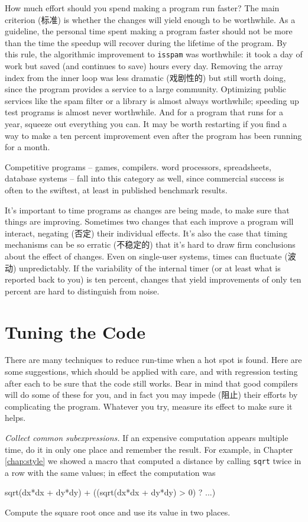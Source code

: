 How much effort should you spend making a program run faster? The main
criterion (标准) is whether the changes will yield enough to be worthwhile.
As a guideline, the personal time spent making a program faster should not
be more than the time the speedup will recover during the lifetime of the
program. By this rule, the algorithmic improvement to \verb'isspam' was
worthwhile: it took a day of work but saved (and continues to save) hours
every day. Removing the array index from the inner loop was less dramatic
(戏剧性的) but still worth doing, since the program provides a service to a
large community. Optimizing public services like the spam filter or a
library is almost always worthwhile; speeding up test programs is almost
never worthwhile. And for a program that runs for a year, squeeze out
everything you can. It may be worth restarting if you find a way to make a
ten percent improvement even after the program has been running for a
month.

Competitive programs -- games, compilers. word processors, spreadsheets,
database systems -- fall into this category as well, since commercial
success is often to the swiftest, at least in published benchmark results.

It's important to time programs as changes are being made, to make sure
that things are improving. Sometimes two changes that each improve a
program will interact, negating (否定) their individual effects. It's also
the case that timing mechanisms can be so erratic (不稳定的) that it's hard
to draw firm conclusions about the effect of changes.  Even on single-user
systems,  times can fluctuate (波动) unpredictably. If the variability of
the internal timer (or at least what is reported back to you) is ten
percent, changes that yield improvements of only ten percent are hard to
distinguish from noise.

\section{Tuning the Code}

There are many techniques to reduce run-time when a hot spot is found. Here
are some suggestions, which should be applied with care, and with
regression testing after each to be sure that the code still works. Bear in
mind that good compilers will do some of these for you, and in fact you may
impede (阻止) their efforts by complicating the program. Whatever you try,
measure its effect to make sure it helps.

\emph{Collect common subexpressions.} If an expensive computation appears
multiple time, do it in only one place and remember the result. For
example, in Chapter \ref{chap:style} we showed a macro that computed a
distance by calling \verb'sqrt' twice in a row with the same values; in
effect the computation was
\begin{badcode}
    sqrt(dx*dx + dy*dy) + ((sqrt(dx*dx + dy*dy) > 0) ? ...)
\end{badcode}
Compute the square root once and use its value in two places.

